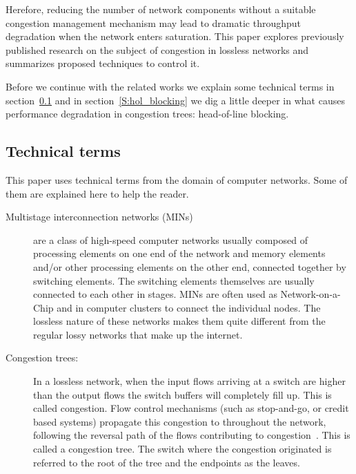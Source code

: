 \documentclass[12pt]{article}
\begin{document}
Herefore, reducing the number of network components without a suitable congestion management mechanism may lead to dramatic throughput degradation when the network enters saturation.
This paper explores previously published research on the subject of congestion in lossless networks and summarizes proposed techniques to control it.

Before we continue with the related works we explain some technical terms in section~\ref{S:terms} and in section~\ref{S:hol_blocking} we dig a little deeper in what causes performance degradation in congestion trees: head-of-line blocking.

\subsection{Technical terms}\label{S:terms}
This paper uses technical terms from the domain of computer networks. Some of them are explained here to help the reader.

\begin{description}

\item[Multistage interconnection networks (MINs)] are a class of high-speed computer networks usually composed of processing elements on one end of the network and memory elements and/or other processing elements on the other end, connected together by switching elements. The switching elements themselves are usually connected to each other in stages. MINs are often used as Network-on-a-Chip and in computer clusters to connect the individual nodes. The lossless nature of these networks makes them quite different from the regular lossy networks that make up the internet.

\item[Congestion trees:] In a lossless network, when the input flows arriving at a switch are higher than the output flows the switch buffers will completely fill up. This is called congestion. Flow control mechanisms (such as stop-and-go, or credit based systems) propagate this congestion to throughout the network, following the reversal path of the flows contributing to congestion~\cite{paper1}. This is called a congestion tree. The switch where the congestion originated is referred to the root of the tree and the endpoints as the leaves. 

\end{description}
\end{document}
